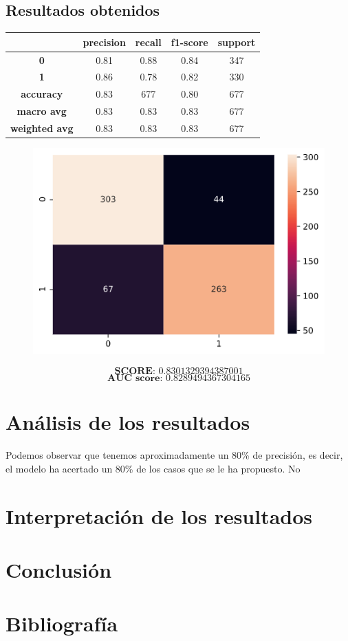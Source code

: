 \documentclass[11pt,a4paper]{article}
\begin{document}
\subsection*{Resultados obtenidos}
\begin{table}[H]
    \centering
    \begin{tabular}{c|cccc}
        \textbf{} & \textbf{precision} & \textbf{recall} & \textbf{f1-score} & \textbf{support} \\ \hline
        \textbf{0} & 0.81 & 0.88 & 0.84 & 347 \\
        \textbf{1} & 0.86 & 0.78 & 0.82 & 330 \\ \hline
        \textbf{accuracy} & 0.83 & 677 & 0.80 & 677 \\
        \textbf{macro avg} & 0.83 & 0.83 & 0.83 & 677 \\
        \textbf{weighted avg} & 0.83 & 0.83 & 0.83 & 677
    \end{tabular}
\end{table}

\begin{figure}[H]
    \centering
    \includegraphics[scale=0.5]{img/matrix-neuralnetwork.png}    
\end{figure}
$$\textbf{SCORE:  } 0.8301329394387001$$
$$\textbf{AUC score:  } 0.8289494367304165$$

\section{Análisis de los resultados}
Podemos observar que tenemos aproximadamente un 80\% de precisión, es decir, el modelo ha acertado un 80\% de los casos que se le
ha propuesto. No 


\section{Interpretación de los resultados}


\section{}


\section{Conclusión}


\section{Bibliografía}
\end{document}

